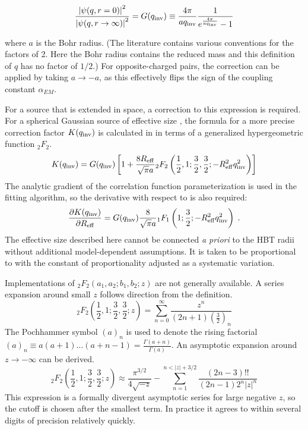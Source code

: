 \begin{equation} \frac{\left| \psi (q, r=0) \right|^2}{\left| \psi (q, r\rightarrow\infty) \right|^2} = G(q_{\mathrm{inv}}) \equiv \frac{4\pi}{a q_{\mathrm{inv}}}\frac{1}{e^{\frac{4\pi}{a q_{\mathrm{inv}}}} - 1} \end{equation}

where $a$ is the Bohr radius.
(The literature contains various conventions for the factors of 2.
Here the Bohr radius contains the reduced mass and this definition of $q$ has no factor of $1/2$.)
For opposite-charged pairs, the correction can be applied by taking $a \to -a$, as this effectively flips the sign of the coupling constant $\alpha_{EM}$.

For a source that is extended in space, a correction to this expression is required.
For a spherical Gaussian source of effective size \Reff, the formula for a more precise correction factor $K(q_{\mathrm{inv}})$ is calculated in  in terms of a generalized hypergeometric function ${}_2 F_2$.
\begin{equation} K(q_{\mathrm{inv}}) = G(q_{\mathrm{inv}}) \left[ 1 + \frac{8R_{\mathrm{eff}}}{\sqrt{\pi}a} {}_2 F_2 \left( \frac{1}{2}, 1; \frac{3}{2}, \frac{3}{2}; -R_{\mathrm{eff}}^2 q_{\mathrm{inv}}^2 \right) \right] \end{equation}
The analytic gradient of the correlation function parameterization is used in the fitting algorithm, so the derivative with respect to \Reff is also required:
\begin{equation}
  \frac{\partial K(q_{\mathrm{inv}})}{\partial R_{\mathrm{eff}}} = G(q_{\mathrm{inv}}) \frac{8}{\sqrt{\pi}a} {}_1 F_1 \left( 1; \frac{3}{2}; -R_{\mathrm{eff}}^2 q_{\mathrm{inv}}^2 \right) \; .
\end{equation}
The effective size \Reff described here cannot be connected \emph{a priori} to the HBT radii without additional model-dependent assumptions.
It is taken to be proportional to \Rinv with the constant of proportionality adjusted as a systematic variation.

Implementations of ${}_2F_2 (a_1, a_2; b_1, b_2; z)$ are not generally available.
A series expansion around small $z$ follows direction from the definition.
\begin{equation} {}_2F_2 \left( \frac{1}{2}, 1; \frac{3}{2}, \frac{3}{2}; z \right) = \sum_{n=0}^{\infty} \frac{z^n}{(2n+1) \left(\frac{3}{2}\right)_n} \end{equation}
The Pochhammer symbol $(a)_n$ is used to denote the rising factorial $(a)_n \equiv a(a+1)...(a+n-1) = \frac{\Gamma(a+n)}{\Gamma(a)}$.
An asymptotic expansion around $z \to - \infty$ can be derived.
\begin{equation} {}_2F_2 \left( \frac{1}{2}, 1; \frac{3}{2}, \frac{3}{2}; z \right) \approx \frac{\pi^{3/2}}{4\sqrt{-z}} - \sum_{n=1}^{n < |z| + 3/2} \frac{(2n-3)!!}{(2n-1) 2^n |z|^n}  \end{equation}
This expression is a formally divergent asymptotic series for large negative $z$, so the cutoff is chosen after the smallest term.
In practice it agrees to within several digits of precision relatively quickly.

